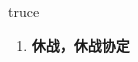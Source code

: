 
\begin{frame}
{\huge truce}
\begin{center}
\begin{enumerate}\Large
  \item \textbf{休战，休战协定}
\end{enumerate}
\end{center}
\end{frame}
